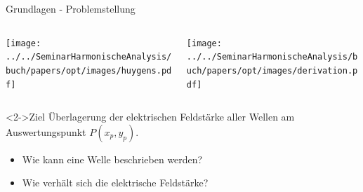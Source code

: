 \begin{frame}[plain]
\end{frame}

\begin{frame}{Grundlagen - Problemstellung}
    \begin{columns}
        \begin{column}{0.3\textwidth}
            \texttt{[image: ../../SeminarHarmonischeAnalysis/buch/papers/opt/images/huygens.pdf]}
        \end{column}
        \begin{column}{0.7\textwidth}
            \texttt{[image: ../../SeminarHarmonischeAnalysis/buch/papers/opt/images/derivation.pdf]}
        \end{column}
    \end{columns}

    \begin{block}<2->{Ziel}
        Überlagerung der elektrischen Feldstärke aller Wellen am Auswertungspunkt $P(x_p, y_p)$.

        \begin{itemize}
            \item<3-> Wie kann eine Welle beschrieben werden?
            \item<4-> Wie verhält sich die elektrische Feldstärke?
        \end{itemize}
    \end{block}
\end{frame}

